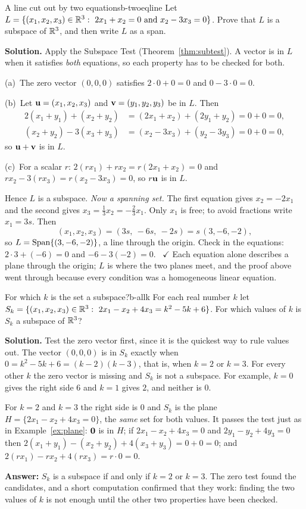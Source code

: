 \documentclass[11pt]{article}
\begin{document}
\begin{exmp}{A line cut out by two equations}{b-twoeqline}
Let $L=\{(x_1,x_2,x_3)\in\R^3:\ 2x_1+x_2=0\ \text{and}\ x_2-3x_3=0\}$. Prove that $L$ is a subspace of $\mathbb{R}^3$, and then write $L$ as a span.

\textbf{Solution.} Apply the Subspace Test (Theorem~\ref{thm:subtest}). A vector is in $L$ when it satisfies \emph{both} equations, so each property has to be checked for both.

(a)~The zero vector $(0,0,0)$ satisfies $2\cdot0+0=0$ and $0-3\cdot0=0$.

(b)~Let $\mathbf{u}=(x_1,x_2,x_3)$ and $\mathbf{v}=(y_1,y_2,y_3)$ be in $L$. Then
\begin{align*}
2(x_1+y_1)+(x_2+y_2)&=(2x_1+x_2)+(2y_1+y_2)=0+0=0,\\
(x_2+y_2)-3(x_3+y_3)&=(x_2-3x_3)+(y_2-3y_3)=0+0=0,
\end{align*}
so $\mathbf{u}+\mathbf{v}$ is in $L$.

(c)~For a scalar $r$: $2(rx_1)+rx_2=r(2x_1+x_2)=0$ and $rx_2-3(rx_3)=r(x_2-3x_3)=0$, so $r\mathbf{u}$ is in $L$.

Hence $L$ is a subspace. \emph{Now a spanning set.} The first equation gives $x_2=-2x_1$ and the second gives $x_3=\tfrac13x_2=-\tfrac23x_1$. Only $x_1$ is free; to avoid fractions write $x_1=3s$. Then
\[
(x_1,x_2,x_3)=(3s,\ -6s,\ -2s)=s\,(3,-6,-2),
\]
so $L=\operatorname{Span}\{(3,-6,-2)\}$, a line through the origin. Check in the equations: $2\cdot3+(-6)=0$ and $-6-3(-2)=0$. \ $\checkmark$ Each equation alone describes a plane through the origin; $L$ is where the two planes meet, and the proof above went through because every condition was a homogeneous linear equation.
\end{exmp}

\begin{exmp}{For which $k$ is the set a subspace?}{b-allk}
For each real number $k$ let $S_k=\{(x_1,x_2,x_3)\in\R^3:\ 2x_1-x_2+4x_3=k^2-5k+6\}$. For which values of $k$ is $S_k$ a subspace of $\mathbb{R}^3$?

\textbf{Solution.} Test the zero vector first, since it is the quickest way to rule values out. The vector $(0,0,0)$ is in $S_k$ exactly when $0=k^2-5k+6=(k-2)(k-3)$, that is, when $k=2$ or $k=3$. For every other $k$ the zero vector is missing and $S_k$ is not a subspace. For example, $k=0$ gives the right side $6$ and $k=1$ gives $2$, and neither is $0$.

For $k=2$ and $k=3$ the right side is $0$ and $S_k$ is the plane $H=\{2x_1-x_2+4x_3=0\}$, the \emph{same} set for both values. It passes the test just as in Example~\ref{ex:plane}: $\mathbf{0}$ is in $H$; if $2x_1-x_2+4x_3=0$ and $2y_1-y_2+4y_3=0$ then $2(x_1+y_1)-(x_2+y_2)+4(x_3+y_3)=0+0=0$; and $2(rx_1)-rx_2+4(rx_3)=r\cdot0=0$.

\textbf{Answer:} $S_k$ is a subspace if and only if $k=2$ or $k=3$. The zero test found the candidates, and a short computation confirmed that they work: finding the two values of $k$ is not enough until the other two properties have been checked.
\end{exmp}
\end{document}
